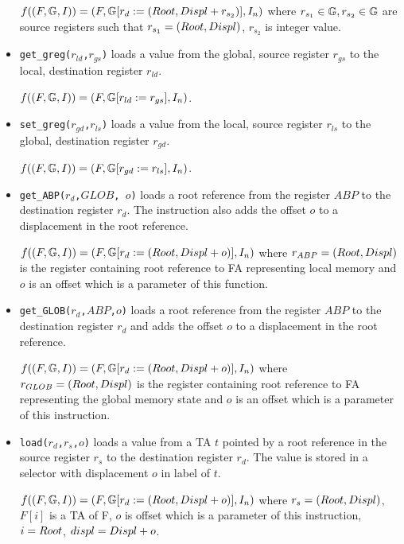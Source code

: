 \begin{itemize}
		$f((F, \mathbb{G}, I)) = (F, \mathbb{G} [r_d := (Root,Displ + r_{s_2})], I_n)$
		where $r_{s_1} \in \mathbb{G}, r_{s_2} \in \mathbb{G}$ are source registers such that
		$r_{s_1}=(Root,Displ)$, $r_{s_2}$ is integer value.
	
	\item {\tt get\_greg($r_{ld}$,$r_{gs}$)} loads a value from the global, source register $r_{gs}$ to
		the local, destination register $r_{ld}$.
		
		$f((F, \mathbb{G}, I)) = (F, \mathbb{G} [r_{ld} := r_{gs}], I_n)$.
	
	\item {\tt set\_greg($r_{gd}$,$r_{ls}$)} loads a value from the local, source register $r_{ls}$ to
		the global, destination register $r_{gd}$.
		
		$f((F, \mathbb{G}, I)) = (F, \mathbb{G} [r_{gd} := r_{ls}], I_n)$.
	
	\item {\tt get\_ABP($r_d$,$GLOB$, $o$)} loads a root reference from the register $ABP$ to
		the destination register $r_d$. The instruction also adds the offset $o$ to a displacement
		in the root reference.

		$f((F, \mathbb{G}, I)) = (F, \mathbb{G} [r_d := 
			(Root,Displ + o)], I_n)$ where $r_{ABP}=(Root,Displ)$ is the register containing root
		reference to FA representing local memory and $o$ is an offset
		which is a parameter of this function.
	
	\item {\tt get\_GLOB($r_d$,$ABP$,$o$)} loads a root reference from the register $ABP$
		to the destination register $r_d$ and adds the offset $o$ to a displacement in the root reference.
		
		$f((F, \mathbb{G}, I)) = (F, \mathbb{G} [r_{d} := 
				(Root,Displ + o)
			], I_n)$ where $r_{GLOB}=(Root,Displ)$ is the register containing root
			reference to FA representing the global memory state and $o$ is an offset
			which is a parameter of this instruction.
	
	\item {\tt load($r_d$,$r_s$,$o$)} loads a value from a TA $t$ pointed
		by a root reference in the source register $r_s$ to the destination register $r_d$.
		The value is stored in a selector with displacement $o$ in label of $t$.
		
		$f((F, \mathbb{G}, I)) = (F, \mathbb{G} [r_{d} := 
				(Root,Displ + o)
			], I_n)$
			where $r_{s}=(Root,Displ)$,
			$F[i]$ is a TA of F,
			$o$ is offset which is a parameter of this instruction,
			$i=Root$,
			$displ=Displ + o$.


\end{itemize}
